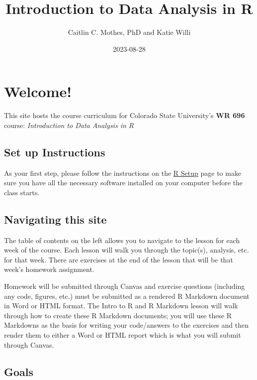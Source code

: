 \documentclass[
]{book}
\title{Introduction to Data Analysis in R}
\author{Caitlin C. Mothes, PhD and Katie Willi}
\date{2023-08-28}
\begin{document}
\maketitle

{
\setcounter{tocdepth}{1}
\tableofcontents
}
\hypertarget{welcome}{%
\chapter{Welcome!}\label{welcome}}

This site hosts the course curriculum for Colorado State University's \textbf{WR 696} course: \emph{Introduction to Data Analysis in R}

\hypertarget{set-up-instructions}{%
\section*{Set up Instructions}\label{set-up-instructions}}

As your first step, please follow the instructions on the \protect\hyperlink{setup-instructions}{R Setup} page to make sure you have all the necessary software installed on your computer before the class starts.

\hypertarget{navigating-this-site}{%
\section*{Navigating this site}\label{navigating-this-site}}

The table of contents on the left allows you to navigate to the lesson for each week of the course. Each lesson will walk you through the topic(s), analysis, etc. for that week. There are exercises at the end of the lesson that will be that week's homework assignment.

Homework will be submitted through Canvas and exercise questions (including any code, figures, etc.) must be submitted as a rendered R Markdown document in Word or HTML format. The Intro to R and R Markdown lesson will walk through how to create these R Markdown documents; you will use these R Markdowns as the basis for writing your code/answers to the exercises and then render them to either a Word or HTML report which is what you will submit through Canvas.

\hypertarget{goals}{%
\section*{Goals}\label{goals}}
\end{document}
